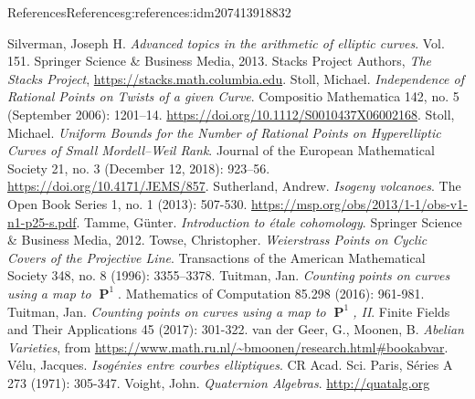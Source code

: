 \documentclass[oneside,10pt,]{book}
\numberwithin{equation}{section}
\DeclareMathOperator{\PP}{\mathbf{P}}
\begin{document}
\begin{references-chapter-numberless}{References}{}{References}{}{}{g:references:idm207413918832}
\begin{thebibliography}{9}
\hypertarget{x:biblio:bib-silverman-advanced}{}Silverman, Joseph H. \textit{Advanced topics in the arithmetic of elliptic curves}. Vol. 151. Springer Science \& Business Media, 2013.
\hypertarget{x:biblio:bib-stacks}{}Stacks Project Authors, \textit{The Stacks Project}, \url{https://stacks.math.columbia.edu}.
\hypertarget{x:biblio:bib-stoll-independence}{}Stoll, Michael. \textit{Independence of Rational Points on Twists of a given Curve}. Compositio Mathematica 142, no. 5 (September 2006): 1201–14. \url{https://doi.org/10.1112/S0010437X06002168}.
\hypertarget{x:biblio:bib-stoll-uniform}{}Stoll, Michael. \textit{Uniform Bounds for the Number of Rational Points on Hyperelliptic Curves of Small Mordell–Weil Rank}. Journal of the European Mathematical Society 21, no. 3 (December 12, 2018): 923–56. \url{https://doi.org/10.4171/JEMS/857}.
\hypertarget{x:biblio:bib-sutherland}{}Sutherland, Andrew. \textit{Isogeny volcanoes}. The Open Book Series 1, no. 1 (2013): 507-530. \url{https://msp.org/obs/2013/1-1/obs-v1-n1-p25-s.pdf}.
\hypertarget{x:biblio:bib-tamme}{}Tamme, Günter. \textit{Introduction to étale cohomology}. Springer Science \& Business Media, 2012.
\hypertarget{x:biblio:bib-towse}{}Towse, Christopher. \textit{Weierstrass Points on Cyclic Covers of the Projective Line}. Transactions of the American Mathematical Society 348, no. 8 (1996): 3355–3378.
\hypertarget{x:biblio:bib-tuitman-map-to-p1-1}{}Tuitman, Jan. \textit{Counting points on curves using a map to \(\PP^1\)}. Mathematics of Computation 85.298 (2016): 961-981.
\hypertarget{x:biblio:bib-tuitman-map-to-p1-2}{}Tuitman, Jan. \textit{Counting points on curves using a map to \(\PP^1\), II}. Finite Fields and Their Applications 45 (2017): 301-322.
\hypertarget{x:biblio:bib-vandergeer-moonen}{}van der Geer, G., Moonen, B. \textit{Abelian Varieties}, from \url{https://www.math.ru.nl/\~bmoonen/research.html\#bookabvar}.
\hypertarget{x:biblio:bib-velu}{}Vélu, Jacques. \textit{Isogénies entre courbes elliptiques}. CR Acad. Sci. Paris, Séries A 273 (1971): 305-347.
\hypertarget{x:biblio:bib-voight-quat}{}Voight, John. \textit{Quaternion Algebras}. \url{http://quatalg.org}

\end{thebibliography}
\end{references-chapter-numberless}
\end{document}
